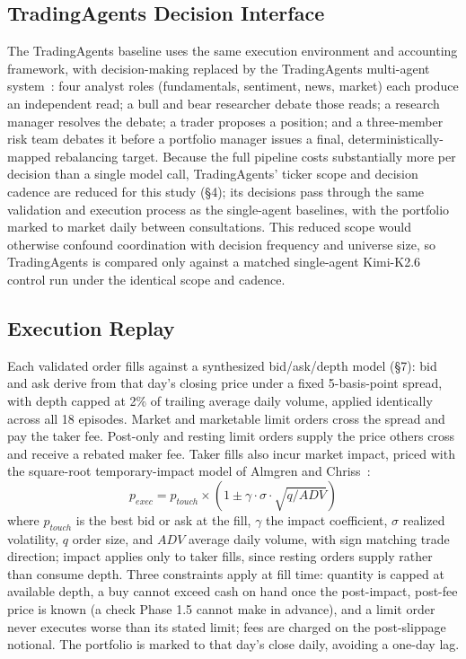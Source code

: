 \documentclass{article}
\begin{document}
\subsection{TradingAgents Decision Interface}
The TradingAgents baseline uses the same execution environment and accounting framework, with decision-making replaced by the TradingAgents multi-agent system~\cite{xiao2024ta}: four analyst roles (fundamentals, sentiment, news, market) each produce an independent read; a bull and bear researcher debate those reads; a research manager resolves the debate; a trader proposes a position; and a three-member risk team debates it before a portfolio manager issues a final, deterministically-mapped rebalancing target. Because the full pipeline costs substantially more per decision than a single model call, TradingAgents' ticker scope and decision cadence are reduced for this study (\S4); its decisions pass through the same validation and execution process as the single-agent baselines, with the portfolio marked to market daily between consultations. This reduced scope would otherwise confound coordination with decision frequency and universe size, so TradingAgents is compared only against a matched single-agent Kimi-K2.6 control run under the identical scope and cadence.
\subsection{Execution Replay}
Each validated order fills against a synthesized bid/ask/depth model (\S7): bid and ask derive from that day's closing price under a fixed 5-basis-point spread, with depth capped at 2\% of trailing average daily volume, applied identically across all 18 episodes. Market and marketable limit orders cross the spread and pay the taker fee. Post-only and resting limit orders supply the price others cross and receive a rebated maker fee.
Taker fills also incur market impact, priced with the square-root temporary-impact model of Almgren and Chriss~\cite{almgren2000}:
\[
p_{exec} = p_{touch} \times \left(1 \pm \gamma \cdot \sigma \cdot \sqrt{q / ADV}\right)
\]
where $p_{touch}$ is the best bid or ask at the fill, $\gamma$ the impact coefficient, $\sigma$ realized volatility, $q$ order size, and $ADV$ average daily volume, with sign matching trade direction; impact applies only to taker fills, since resting orders supply rather than consume depth. Three constraints apply at fill time: quantity is capped at available depth, a buy cannot exceed cash on hand once the post-impact, post-fee price is known (a check Phase 1.5 cannot make in advance), and a limit order never executes worse than its stated limit; fees are charged on the post-slippage notional. The portfolio is marked to that day's close daily, avoiding a one-day lag.
\end{document}
